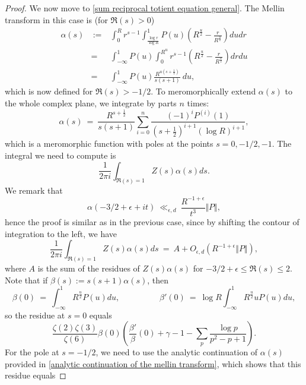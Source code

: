 \documentclass[12pt,reqno]{amsart}
\numberwithin{equation}{section}
\theoremstyle{plain}
\begin{document}
\begin{proof}
We now move to \eqref{sum reciprocal totient equation general}. The Mellin transform in this case is (for $\Re (s)>0$)
\begin{eqnarray} \alpha(s)& \ := \ & \int_0^R r^{s-1}\int_{\frac{\log r}{\log R}} ^1 P(u) \left(R^{\frac u2} -\frac r{R^{\frac u2}} \right) du dr \nonumber\\
&=& \int_{-\infty}^1 P(u) \int_0^{R^u } r^{s-1} \left(R^{\frac u2} -\frac r{R^{\frac u2}} \right) dr du \nonumber\\
&=& \int_{-\infty}^1 P(u) \frac{R^{u(s+\frac 12)}}{s(s+1)}\ du,
\end{eqnarray}
which is now defined for $\Re(s)>-1/2$. To meromorphically extend $\alpha(s)$ to the whole complex plane, we integrate by parts $n$ times:
\begin{equation} \alpha(s)\ =\ \frac{R^{s+\frac 12}}{s(s+1)}\sum_{i=0}^{n}  \frac {(-1)^i P^{(i)}(1)}{(s+\frac 12)^{i+1} (\log R)^{i+1}},
\label{analytic continuation of the mellin transform}
\end{equation}
which is a meromorphic function with poles at the points $s=0,-1/2, -1$. The integral we need to compute is
\begin{equation} \frac 1{2\pi i} \int_{\Re (s)=1} Z(s) \alpha(s) ds. \end{equation}
We remark that
\begin{equation} \alpha(-3/2 +\epsilon+it)\ \ll_{\epsilon,d}\ \frac {R^{- 1+\epsilon}}{t^3}\Vert P\Vert,\end{equation}
hence the proof is similar as in the previous case, since by shifting the contour of integration to the left, we have
\begin{equation} \frac 1{2\pi i} \int_{\Re (s)=1} Z(s) \alpha(s) ds\ =\ A+O_{\epsilon,d}(R^{-1+\epsilon}\Vert P\Vert), \end{equation}
where $A$ is the sum of the residues of $Z(s) \alpha(s)$ for $-3/2+\epsilon \leq \Re (s) \leq 2$. Note that if $\beta(s):=s(s+1)\alpha(s)$, then
\begin{equation} \beta(0) \ = \ \int_{-\infty}^1 R^{\frac u2}P(u)du, \hspace{2cm} \beta'(0)\ =\ \log R \int_{-\infty}^1 R^{\frac u2}uP(u)du, \end{equation}
so the residue at $s=0$ equals
\begin{equation} \frac{\zeta(2)\zeta(3)}{\zeta(6)}\beta(0) \left( \frac{\beta'}{\beta}(0)+\gamma-1- \sum_p\frac{\log p}{p^2-p+1}  \right).  \end{equation}
For the pole at $s=-1/2$, we need to use the analytic continuation of $\alpha(s)$ provided in \eqref{analytic continuation of the mellin transform}, which shows that this residue equals

\end{proof}
\end{document}
